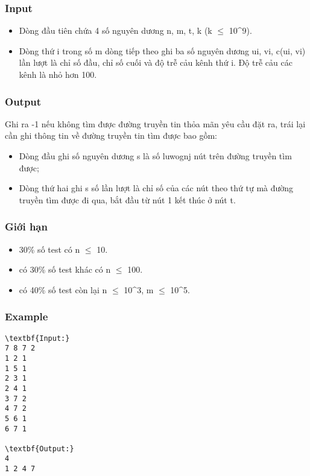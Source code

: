 \subsubsection{Input}
\begin{itemize}
	\item Dòng đầu tiên chứa 4 số nguyên dương n, m, t, k (k  $\le$  10\textasciicircum9).
	\item Dòng thứ i trong số m dòng tiếp theo ghi ba số nguyên dương ui, vi, c(ui, vi) lần lượt là chỉ số đầu, chỉ số cuối và độ trễ cảu kênh thứ i. Độ trễ cảu các kênh là nhỏ hơn 100.
\end{itemize}

\subsubsection{Output}

Ghi ra -1 nếu không tìm được đường truyền tin thỏa mãn yêu cầu đặt ra, trái lại cần ghi thông tin về đường truyền tin tìm được bao gồm:
\begin{itemize}
	\item Dòng đầu ghi số nguyên dương s là số luwognj nút trên đường truyền tìm được;
	\item Dòng thứ hai ghi s số lần lượt là chỉ số của các nút theo thứ tự mà đường truyền tìm được đi qua, bắt đầu từ nút 1 kết thúc ở nút t.
\end{itemize}

\subsubsection{Giới hạn}
\begin{itemize}
	\item 30\% số test có n  $\le$  10.
	\item có 30\% số test khác có n  $\le$  100.
	\item có 40\% số test còn lại n  $\le$  10\textasciicircum3, m  $\le$  10\textasciicircum5.
\end{itemize}

\subsubsection{Example}
\begin{verbatim}
\textbf{Input:}
7 8 7 2
1 2 1
1 5 1
2 3 1
2 4 1
3 7 2
4 7 2
5 6 1
6 7 1

\textbf{Output:}
4
1 2 4 7
\end{verbatim}
